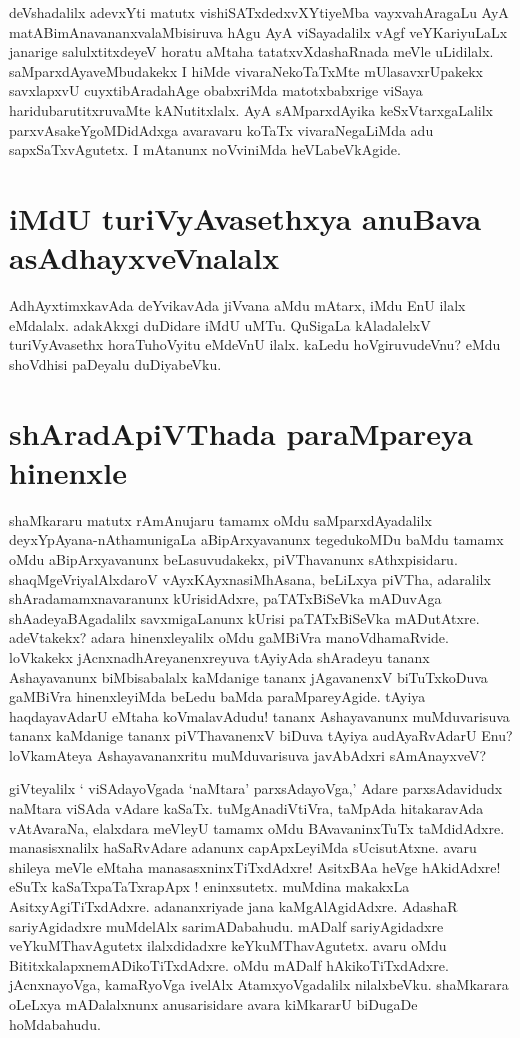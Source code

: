 deVshadalilx adevxYti matutx vishiSATxdedxvXYtiyeMba vayxvahAragaLu AyA matABimAnavananxvalaMbisiruva hAgu AyA viSayadalilx vAgf veYKariyuLaLx janarige salulxtitxdeyeV horatu aMtaha tatatxvXdashaRnada meVle uLidilalx. saMparxdAyaveMbudakekx I hiMde vivaraNekoTaTxMte mUlasavxrUpakekx savxlapxvU cuyxtibAradahAge obabxriMda matotxbabxrige viSaya haridubarutitxruvaMte kANutitxlalx. AyA sAMparxdAyika keSxVtarxgaLalilx parxvAsakeYgoMDidAdxga avaravaru koTaTx vivaraNegaLiMda adu sapxSaTxvAgutetx. I mAtanunx noVviniMda heVLabeVkAgide.

\section*{iMdU turiVyAvasethxya anuBava asAdhayxveVnalalx}

AdhAyxtimxkavAda deYvikavAda jiVvana aMdu mAtarx, iMdu EnU ilalx eMdalalx. adakAkxgi duDidare iMdU uMTu. QuSigaLa kAladalelxV turiVyAvasethx horaTuhoVyitu eMdeVnU ilalx. kaLedu hoVgiruvudeVnu? eMdu shoVdhisi paDeyalu duDiyabeVku.

\section*{shAradApiVThada paraMpareya hinenxle}

shaMkararu matutx rAmAnujaru tamamx oMdu saMparxdAyadalilx deyxYpAyana-nAthamunigaLa aBipArxyavanunx tegedukoMDu baMdu tamamx oMdu aBipArxyavanunx beLasuvudakekx, piVThavanunx sAthxpisidaru. shaqMgeVriyalAlxdaroV vAyxKAyxnasiMhAsana, beLiLxya piVTha, adaralilx shAradamamxnavaranunx kUrisidAdxre, paTATxBiSeVka mADuvAga shAadeyaBAgadalilx savxmigaLanunx kUrisi paTATxBiSeVka mADutAtxre. adeVtakekx? adara hinenxleyalilx oMdu gaMBiVra manoVdhamaRvide. loVkakekx  jAcnxnadhAreyanenxreyuva tAyiyAda shAradeyu tananx Ashayavanunx biMbisabalalx kaMdanige tananx jAgavanenxV biTuTxkoDuva gaMBiVra hinenxleyiMda beLedu baMda paraMpareyAgide. tAyiya haqdayavAdarU eMtaha koVmalavAdudu! tananx Ashayavanunx muMduvarisuva tananx kaMdanige tananx piVThavanenxV biDuva tAyiya audAyaRvAdarU Enu? loVkamAteya Ashayavananxritu muMduvarisuva javAbAdxri sAmAnayxveV?

giVteyalilx ` viSAdayoVgada `naMtara' parxsAdayoVga,' Adare parxsAdavidudx naMtara viSAda vAdare kaSaTx. tuMgAnadiVtiVra, taMpAda hitakaravAda vAtAvaraNa, elalxdara meVleyU tamamx oMdu BAvavaninxTuTx taMdidAdxre. manasisxnalilx haSaRvAdare adanunx capApxLeyiMda sUcisutAtxne. avaru shileya meVle eMtaha manasasxninxTiTxdAdxre! AsitxBAa heVge hAkidAdxre! eSuTx kaSaTxpaTaTxrapApx ! eninxsutetx. muMdina makakxLa AsitxyAgiTiTxdAdxre. adananxriyade jana kaMgAlAgidAdxre. AdashaR sariyAgidadxre muMdelAlx sarimADabahudu. mADalf sariyAgidadxre veYkuMThavAgutetx ilalxdidadxre keYkuMThavAgutetx. avaru oMdu BititxkalapxnemADikoTiTxdAdxre. oMdu mADalf hAkikoTiTxdAdxre. jAcnxnayoVga, kamaRyoVga ivelAlx AtamxyoVgadalilx nilalxbeVku. shaMkarara oLeLxya mADalalxnunx anusarisidare avara kiMkararU biDugaDe hoMdabahudu.

